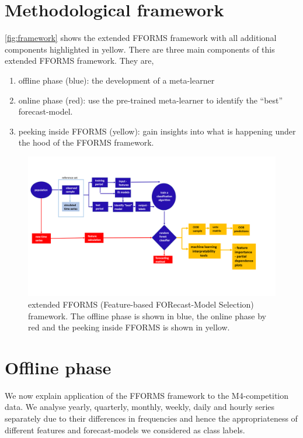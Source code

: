 \documentclass[11pt,a4paper,]{article}
\providecommand{\tightlist}{%
  \setlength{\itemsep}{0pt}\setlength{\parskip}{0pt}}
\begin{document}
\hypertarget{fforms}{%
\section{Methodological framework}\label{fforms}}

\autoref{fig:framework} shows the extended FFORMS framework with all additional components highlighted in yellow. There are three main components of this extended FFORMS framework. They are,

\begin{enumerate}
\def\labelenumi{\arabic{enumi}.}
\tightlist
\item
  offline phase (blue): the development of a meta-learner
\item
  online phase (red): use the pre-trained meta-learner to identify the ``best'' forecast-model.
\item
  peeking inside FFORMS (yellow): gain insights into what is happening under the hood of the FFORMS framework.
\end{enumerate}

\begin{figure}[h]
\includegraphics[width=1.1\linewidth]{img/framework2} \caption{extended FFORMS (Feature-based FORecast-Model Selection) framework. The offline phase is shown in blue, the online phase by red and the peeking inside FFORMS is shown in yellow.}\label{fig:framework}
\end{figure}

\hypertarget{offline}{%
\section{Offline phase}\label{offline}}

We now explain application of the FFORMS framework to the M4-competition data. We analyse yearly, quarterly, monthly, weekly, daily and hourly series separately due to their differences in frequencies and hence the appropriateness of different features and forecast-models we considered as class labels.
\end{document}
